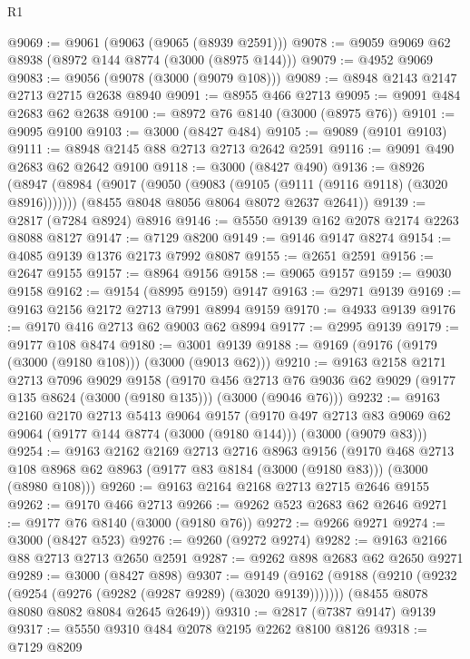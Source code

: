 \begin{lexlean}{R1}
\begin{coremodule}
@9069 := @9061 (@9063 (@9065 (@8939 @2591)))
@9078 := @9059 @9069 @62 @8938 (@8972 @144 @8774 (@3000 (@8975 @144)))
@9079 := @4952 @9069
@9083 := @9056 (@9078 (@3000 (@9079 @108)))
@9089 := @8948 @2143 @2147 @2713 @2715 @2638 @8940
@9091 := @8955 @466 @2713
@9095 := @9091 @484 @2683 @62 @2638
@9100 := @8972 @76 @8140 (@3000 (@8975 @76))
@9101 := @9095 @9100
@9103 := @3000 (@8427 @484)
@9105 := @9089 (@9101 @9103)
@9111 := @8948 @2145 @88 @2713 @2713 @2642 @2591
@9116 := @9091 @490 @2683 @62 @2642 @9100
@9118 := @3000 (@8427 @490)
@9136 := @8926
    (@8947
      (@8984 (@9017 (@9050 (@9083 (@9105 (@9111 (@9116 @9118) (@3020 @8916)))))))
      (@8455 @8048 @8056 @8064 @8072 @2637 @2641))
@9139 := @2817 (@7284 @8924) @8916
@9146 := @5550 @9139 @162 @2078 @2174 @2263 @8088 @8127
@9147 := @7129 @8200
@9149 := @9146 @9147 @8274
@9154 := @4085 @9139 @1376 @2173 @7992 @8087
@9155 := @2651 @2591
@9156 := @2647 @9155
@9157 := @8964 @9156
@9158 := @9065 @9157
@9159 := @9030 @9158
@9162 := @9154 (@8995 @9159) @9147
@9163 := @2971 @9139
@9169 := @9163 @2156 @2172 @2713 @7991 @8994 @9159
@9170 := @4933 @9139
@9176 := @9170 @416 @2713 @62 @9003 @62 @8994
@9177 := @2995 @9139
@9179 := @9177 @108 @8474
@9180 := @3001 @9139
@9188 := @9169 (@9176 (@9179 (@3000 (@9180 @108))) (@3000 (@9013 @62)))
@9210 := @9163
    @2158
    @2171
    @2713
    @7096
    @9029
    @9158
    (@9170
      @456
      @2713
      @76
      @9036
      @62
      @9029
      (@9177 @135 @8624 (@3000 (@9180 @135)))
      (@3000 (@9046 @76)))
@9232 := @9163
    @2160
    @2170
    @2713
    @5413
    @9064
    @9157
    (@9170
      @497
      @2713
      @83
      @9069
      @62
      @9064
      (@9177 @144 @8774 (@3000 (@9180 @144)))
      (@3000 (@9079 @83)))
@9254 := @9163
    @2162
    @2169
    @2713
    @2716
    @8963
    @9156
    (@9170
      @468
      @2713
      @108
      @8968
      @62
      @8963
      (@9177 @83 @8184 (@3000 (@9180 @83)))
      (@3000 (@8980 @108)))
@9260 := @9163 @2164 @2168 @2713 @2715 @2646 @9155
@9262 := @9170 @466 @2713
@9266 := @9262 @523 @2683 @62 @2646
@9271 := @9177 @76 @8140 (@3000 (@9180 @76))
@9272 := @9266 @9271
@9274 := @3000 (@8427 @523)
@9276 := @9260 (@9272 @9274)
@9282 := @9163 @2166 @88 @2713 @2713 @2650 @2591
@9287 := @9262 @898 @2683 @62 @2650 @9271
@9289 := @3000 (@8427 @898)
@9307 := @9149
    (@9162
      (@9188 (@9210 (@9232 (@9254 (@9276 (@9282 (@9287 @9289) (@3020 @9139)))))))
      (@8455 @8078 @8080 @8082 @8084 @2645 @2649))
@9310 := @2817 (@7387 @9147) @9139
@9317 := @5550 @9310 @484 @2078 @2195 @2262 @8100 @8126
@9318 := @7129 @8209

\end{coremodule}
\end{lexlean}
